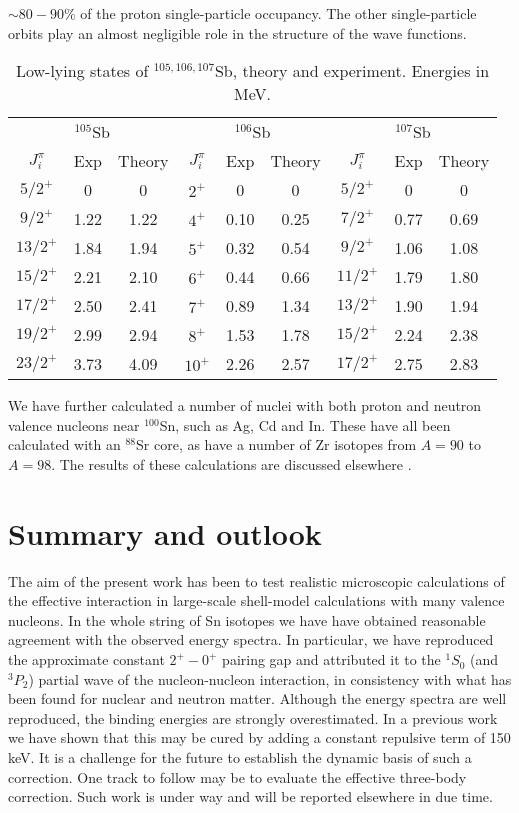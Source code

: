 \documentclass{ws-p8-50x6-00}
\begin{document}
$\sim 80-90\%$ of the proton single-particle occupancy. The other single-particle
orbits play  an almost negligible role in the structure of the wave functions.
\begin{table}[hbt]
\begin{center}
\caption{ Low-lying states of $^{105,106,107}$Sb, theory and experiment.
Energies in MeV. }\footnotesize
\begin{tabular}{ccc|ccc|ccc}
\hline
\multicolumn{3}{c|}{ $^{105}$Sb} & \multicolumn{3}{c|}{ $^{106}$Sb}& \multicolumn{3}{c}{ $^{107}$Sb} \\ 
{$J^{\pi}_i$} & {Exp} & {Theory} & 
{$J^{\pi}_i$} & {Exp} & {Theory} & 
{$J^{\pi}_i$} & {Exp} & {Theory} \\
\hline 
$5/2^{+}$ & 0 & 0 & $2^{+}$ & 0 & 0 & $5/2^{+}$ & 0 & 0 \\
$9/2^{+}$ & 1.22 & 1.22 & $4^{+}$ & 0.10 & 0.25 & $7/2^{+}$ & 0.77 & 0.69 \\
$13/2^{+}$ & 1.84 & 1.94 & $5^{+}$ & 0.32 & 0.54 & $9/2^{+}$ & 1.06 & 1.08  \\
$15/2^{+}$ & 2.21 & 2.10 & $6^{+}$ & 0.44 & 0.66 & $11/2^{+}$ & 1.79 & 1.80 \\
$17/2^{+}$ & 2.50 & 2.41 & $7^{+}$ & 0.89 & 1.34 & $13/2^{+}$ & 1.90 & 1.94  \\
$19/2^{+}$ & 2.99 & 2.94 & $8^{+}$ & 1.53 & 1.78 &  $15/2^{+}$ & 2.24 & 2.38\\
$23/2^{+}$ & 3.73 & 4.09 & $10^{+}$ & 2.26 & 2.57 & $17/2^{+}$ & 2.75 & 2.83  \\\hline
\end{tabular}
\end{center}
\end{table}
We have further calculated a number of nuclei with both 
proton and neutron valence nucleons near $^{100}$Sn,
such as Ag, Cd and In. These have all been calculated 
with an $^{88}$Sr core, as have a number of Zr isotopes from 
$A = 90$ to $A = 98$. The results of these calculations 
are discussed elsewhere \cite{anne2000,matej}.


\section{Summary and outlook}
The aim of the present work has been to test realistic 
microscopic calculations of the effective interaction 
in large-scale shell-model calculations with many valence nucleons. 
In the whole string of Sn isotopes we have have 
obtained reasonable agreement with the observed energy spectra. 
In particular, we have reproduced the approximate constant $2^+ - 0^+$ 
pairing gap and attributed it to the $^1S_0$ (and $^3P_2$) partial 
wave of the nucleon-nucleon interaction, in consistency with what 
has been found for nuclear and neutron matter. 
Although the energy spectra are well reproduced, the binding 
energies are strongly overestimated. In a previous work we have 
shown that this may be cured by adding a constant repulsive 
term of 150 keV. It is a challenge for the future to establish 
the dynamic basis of such a correction. One track to follow may 
be to evaluate the effective three-body correction. 
Such work is under way and will be reported elsewhere in due time.
\end{document}
